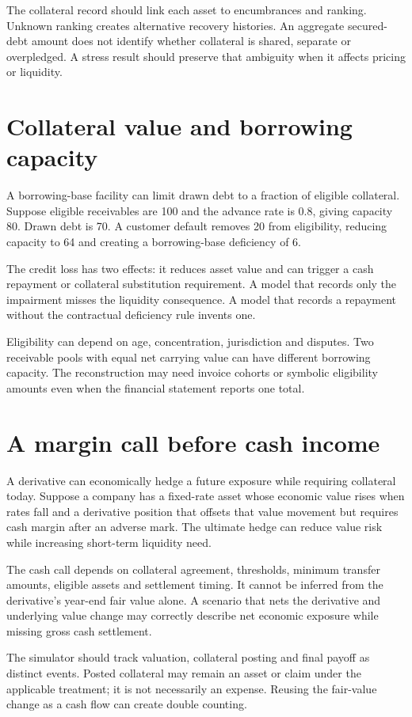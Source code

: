 The collateral record should link each asset to encumbrances and ranking. Unknown ranking creates alternative recovery histories. An aggregate secured-debt amount does not identify whether collateral is shared, separate or overpledged. A stress result should preserve that ambiguity when it affects pricing or liquidity.

\section{Collateral value and borrowing capacity}
A borrowing-base facility can limit drawn debt to a fraction of eligible collateral. Suppose eligible receivables are 100 and the advance rate is 0.8, giving capacity 80. Drawn debt is 70. A customer default removes 20 from eligibility, reducing capacity to 64 and creating a borrowing-base deficiency of 6.

The credit loss has two effects: it reduces asset value and can trigger a cash repayment or collateral substitution requirement. A model that records only the impairment misses the liquidity consequence. A model that records a repayment without the contractual deficiency rule invents one.

Eligibility can depend on age, concentration, jurisdiction and disputes. Two receivable pools with equal net carrying value can have different borrowing capacity. The reconstruction may need invoice cohorts or symbolic eligibility amounts even when the financial statement reports one total.

\section{A margin call before cash income}
A derivative can economically hedge a future exposure while requiring collateral today. Suppose a company has a fixed-rate asset whose economic value rises when rates fall and a derivative position that offsets that value movement but requires cash margin after an adverse mark. The ultimate hedge can reduce value risk while increasing short-term liquidity need.

The cash call depends on collateral agreement, thresholds, minimum transfer amounts, eligible assets and settlement timing. It cannot be inferred from the derivative's year-end fair value alone. A scenario that nets the derivative and underlying value change may correctly describe net economic exposure while missing gross cash settlement.

The simulator should track valuation, collateral posting and final payoff as distinct events. Posted collateral may remain an asset or claim under the applicable treatment; it is not necessarily an expense. Reusing the fair-value change as a cash flow can create double counting.

